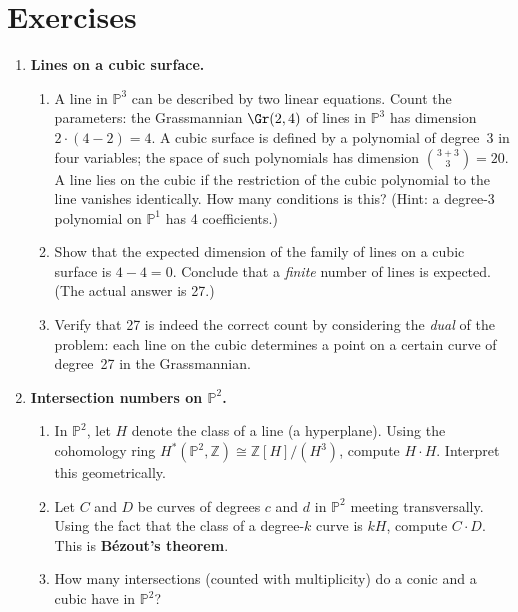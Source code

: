 \section*{Exercises}

\begin{enumerate}

    \item \textbf{Lines on a cubic surface.}
    \begin{enumerate}
        \item A line in $\mathbb{P}^3$ can be described by two linear equations. Count the parameters: the Grassmannian $\Gr(2, 4)$ of lines in $\mathbb{P}^3$ has dimension $2 \cdot (4 - 2) = 4$. A cubic surface is defined by a polynomial of degree~3 in four variables; the space of such polynomials has dimension $\binom{3+3}{3} = 20$. A line lies on the cubic if the restriction of the cubic polynomial to the line vanishes identically. How many conditions is this? (Hint: a degree-3 polynomial on $\mathbb{P}^1$ has 4 coefficients.)
        \item Show that the expected dimension of the family of lines on a cubic surface is $4 - 4 = 0$. Conclude that a \emph{finite} number of lines is expected. (The actual answer is 27.)
        \item Verify that 27 is indeed the correct count by considering the \emph{dual} of the problem: each line on the cubic determines a point on a certain curve of degree~27 in the Grassmannian.
    \end{enumerate}

    \item \textbf{Intersection numbers on $\mathbb{P}^2$.}
    \begin{enumerate}
        \item In $\mathbb{P}^2$, let $H$ denote the class of a line (a hyperplane). Using the cohomology ring $H^*(\mathbb{P}^2, \mathbb{Z}) \cong \mathbb{Z}[H]/(H^3)$, compute $H \cdot H$. Interpret this geometrically.
        \item Let $C$ and $D$ be curves of degrees $c$ and $d$ in $\mathbb{P}^2$ meeting transversally. Using the fact that the class of a degree-$k$ curve is $kH$, compute $C \cdot D$. This is \textbf{B\'ezout's theorem}.
        \item How many intersections (counted with multiplicity) do a conic and a cubic have in $\mathbb{P}^2$?
    \end{enumerate}


\end{enumerate}
